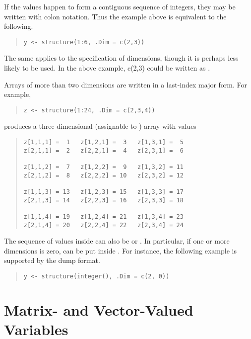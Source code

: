 If the values happen to form a contiguous sequence of integers,
they may be written with colon notation.  Thus the example above is
equivalent to the following.
%
\begin{quote}
\begin{verbatim}
y <- structure(1:6, .Dim = c(2,3))
\end{verbatim}
\end{quote}
%
The same applies to the specification of dimensions, though it is
perhaps less likely to be used. In the above example,
c(2,3) could be written as .

Arrays of more than two dimensions are written in a last-index major form.
For example, 
%
\begin{quote}
\begin{verbatim}
z <- structure(1:24, .Dim = c(2,3,4))
\end{verbatim}
\end{quote}
%
produces a three-dimensional  (assignable to )
array  with values
%
\begin{quote}
\begin{verbatim}
z[1,1,1] =  1   z[1,2,1] =  3   z[1,3,1] =  5
z[2,1,1] =  2   z[2,2,1] =  4   z[2,3,1] =  6

z[1,1,2] =  7   z[1,2,2] =  9   z[1,3,2] = 11
z[2,1,2] =  8   z[2,2,2] = 10   z[2,3,2] = 12

z[1,1,3] = 13   z[1,2,3] = 15   z[1,3,3] = 17
z[2,1,3] = 14   z[2,2,3] = 16   z[2,3,3] = 18

z[1,1,4] = 19   z[1,2,4] = 21   z[1,3,4] = 23
z[2,1,4] = 20   z[2,2,4] = 22   z[2,3,4] = 24
\end{verbatim}
\end{quote}

The sequence of values inside  can also be
 or . In particular, if one
or more dimensions is zero,  can be put inside
.  For instance, the following example is supported
by the dump format.

\begin{quote}
\begin{verbatim}
y <- structure(integer(), .Dim = c(2, 0))
\end{verbatim}
\end{quote}


\section{Matrix- and Vector-Valued Variables}

